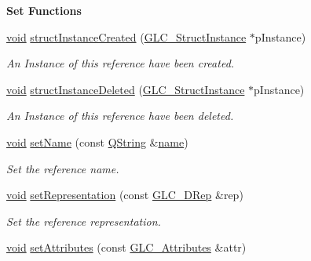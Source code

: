 \begin{Indent}{\bf Set Functions}\par
\begin{DoxyCompactItemize}
\item 
\hyperlink{group___u_a_v_objects_plugin_ga444cf2ff3f0ecbe028adce838d373f5c}{void} \hyperlink{class_g_l_c___struct_reference_a275ffb48d935f4ca00ba3d6bad862a1a}{struct\-Instance\-Created} (\hyperlink{class_g_l_c___struct_instance}{G\-L\-C\-\_\-\-Struct\-Instance} $\ast$p\-Instance)
\begin{DoxyCompactList}\small\item\em An Instance of this reference have been created. \end{DoxyCompactList}\item 
\hyperlink{group___u_a_v_objects_plugin_ga444cf2ff3f0ecbe028adce838d373f5c}{void} \hyperlink{class_g_l_c___struct_reference_a01251d9184b147014b6b696ecb4e2296}{struct\-Instance\-Deleted} (\hyperlink{class_g_l_c___struct_instance}{G\-L\-C\-\_\-\-Struct\-Instance} $\ast$p\-Instance)
\begin{DoxyCompactList}\small\item\em An Instance of this reference have been deleted. \end{DoxyCompactList}\item 
\hyperlink{group___u_a_v_objects_plugin_ga444cf2ff3f0ecbe028adce838d373f5c}{void} \hyperlink{class_g_l_c___struct_reference_a929ea61c8f6bfa8c964262d75d6227a1}{set\-Name} (const \hyperlink{group___u_a_v_objects_plugin_gab9d252f49c333c94a72f97ce3105a32d}{Q\-String} \&\hyperlink{glext_8h_ad977737dfc9a274a62741b9500c49a32}{name})
\begin{DoxyCompactList}\small\item\em Set the reference name. \end{DoxyCompactList}\item 
\hyperlink{group___u_a_v_objects_plugin_ga444cf2ff3f0ecbe028adce838d373f5c}{void} \hyperlink{class_g_l_c___struct_reference_a93296f5961822a26a409b09d60570723}{set\-Representation} (const \hyperlink{class_g_l_c__3_d_rep}{G\-L\-C\-\_\-D\-Rep} \&rep)
\begin{DoxyCompactList}\small\item\em Set the reference representation. \end{DoxyCompactList}\item 
\hyperlink{group___u_a_v_objects_plugin_ga444cf2ff3f0ecbe028adce838d373f5c}{void} \hyperlink{class_g_l_c___struct_reference_af97e88dc074cd91b771c885c2169952f}{set\-Attributes} (const \hyperlink{class_g_l_c___attributes}{G\-L\-C\-\_\-\-Attributes} \&attr)

\end{DoxyCompactItemize}
\end{Indent}
